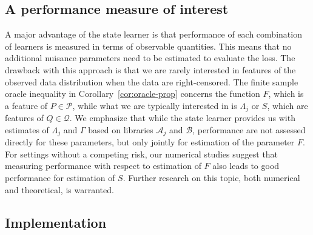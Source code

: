 \documentclass[a4,danish]{article}
\begin{document}
\subsection{A performance measure of interest}
\label{sec:perf-meas-inter}

A major advantage of the state learner is that performance of each combination
of learners is measured in terms of observable quantities. This means that no
additional nuisance parameters need to be estimated to evaluate the loss. The
drawback with this approach is that we are rarely interested in features of the
observed data distribution when the data are right-censored. The finite sample
oracle inequality in Corollary~\ref{cor:oracle-prop} concerns the function
\( F \), which is a feature of \( P \in \mathcal{P} \), while what we are
typically interested in is \( \Lambda_j \) or \( S \), which are features of
\( Q \in \mathcal{Q} \). We emphasize that while the state learner provides us
with estimates of \( \Lambda_j \) and $\Gamma$ based on libraries
\( \mathcal{A}_j \) and \( \mathcal{B} \), performance are not assessed directly
for these parameters, but only jointly for estimation of the parameter \( F \).
For settings without a competing risk, our numerical studies suggest that
measuring performance with respect to estimation of \( F \) also leads to good
performance for estimation of \( S \). Further research on this topic, both
numerical and theoretical, is warranted.



\subsection{Implementation}
\label{sec:software}
\end{document}
